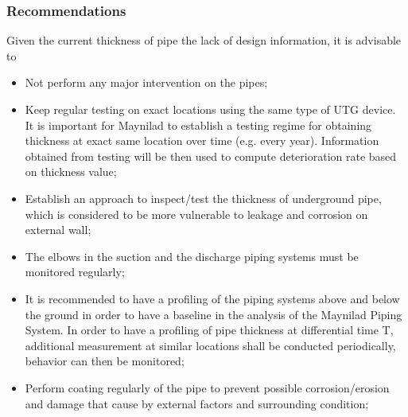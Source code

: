 






\subsubsection{Recommendations}
Given the current thickness of pipe the lack of design information, it is advisable to 
\begin{itemize}
\item Not perform any major intervention on the pipes;
\item Keep regular testing on exact locations using the same type of UTG device. It is important for Maynilad to establish a testing regime for obtaining thickness at exact same location over time (e.g. every year). Information obtained from testing will be then used to compute deterioration rate based on thickness value;
\item Establish an approach to inspect/test the thickness of underground pipe, which is considered to be more vulnerable to leakage and corrosion on external wall;
\item The elbows in the suction and the discharge piping systems must be monitored regularly;
\item It is recommended to have a profiling of the piping systems above and below the ground in order to have a baseline in the analysis of the Maynilad Piping System. In order to have a profiling of pipe thickness at differential time T, additional measurement at similar locations shall be conducted periodically, behavior can then be monitored;
\item Perform coating regularly of the pipe to prevent possible corrosion/erosion and damage that cause by external factors and surrounding condition;
\end{itemize}
%

